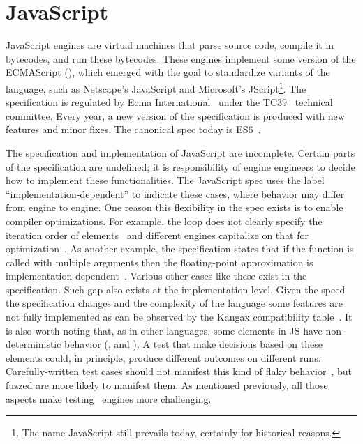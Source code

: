 \documentclass[10pt,conference,anonymous]{IEEEtran}
\begin{document}
\section{JavaScript}
\label{sec:es6-design}
\label{sec:imp-dep-behavior}

JavaScript engines are virtual machines that parse source code,
compile it in bytecodes, and run these bytecodes. These engines
implement some version of the ECMAScript (\es{}), which emerged with
the goal to standardize variants of the language, such as Netscape's
JavaScript and Microsoft's JScript\footnote{The name JavaScript still
  prevails today, certainly for historical reasons.}. The \es{}
specification is regulated by Ecma International~\cite{es6-website}
under the TC39~\cite{tc39-github} technical committee.  Every year, a
new version of the \es{} specification is produced with new features
and minor fixes. The canonical spec today is
ES6~\cite{ecmas262-spec-repo,ecmas262-spec}.


The specification and implementation of JavaScript are
incomplete. Certain parts of the specification are undefined; it is
responsibility of engine engineers to decide how to implement these
functionalities. The JavaScript spec uses the label
``implementation-dependent'' to indicate these cases, where behavior
may differ from engine to engine. One reason this flexibility in the
spec exists is to enable compiler optimizations. For example, the
 loop does not clearly specify the iteration
order of elements~\cite{so-forin-undefined,javascript-in-chrome} and different
engines capitalize on that for optimization~\cite{for-in-undefined}.  As another
example, the specification states that if
the  function is called with multiple arguments then the floating-point approximation is
implementation-dependent~\cite{es6-toPrecision}. Various other cases
like these exist in the specification. Such gap also exists at the
implementation level. Given the speed the specification changes and
the complexity of the language some features are not fully implemented
as can be observed by the Kangax compatibility table~\cite{kangax}.
It is also worth noting that, as in other languages, some
elements in JS have non-deterministic behavior (\eg{},
 and ). A test that make decisions
based on these elements could, in principle, produce different
outcomes on different runs. Carefully-written test cases should not
manifest this kind of
flaky behavior~\cite{luo-etal-fse2014,palomba-zaidman-icsme2017}, but
fuzzed are more likely to manifest them.
As mentioned previously, all those aspects make testing \js\ engines
more challenging.
\end{document}
